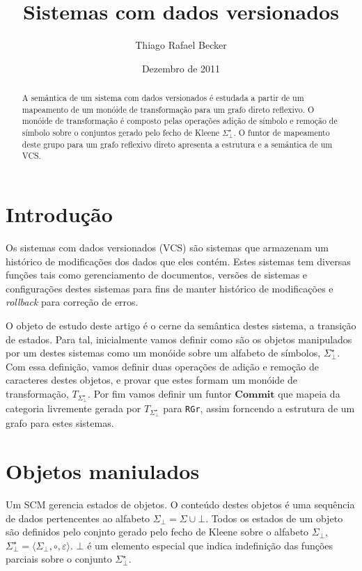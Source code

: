 \documentclass[a4paper]{article}
\title{Sistemas com dados versionados}
\author{Thiago Rafael Becker}
\date{Dezembro de 2011}
\newcommand{\baseset}{{\Sigma^\star_\bot}}
\newcommand{\transMon}{{T_\baseset}}
\newcommand{\composition}{{\circ}}
\newcommand{\commit}{{\mathbf{Commit}}}
\begin{document}
\maketitle
\begin{abstract}
A semântica de um sistema com dados versionados é estudada a partir de um mapeamento de um monóide de transformação para um grafo direto reflexivo. O monóide de transformação é composto pelas operações adição de símbolo e remoção de símbolo sobre o conjuntos gerado pelo fecho de Kleene $\baseset$. O funtor de mapeamento deste grupo para um grafo reflexivo direto apresenta a estrutura e a semântica de um VCS.
\end{abstract}

\section*{Introdução}
Os sistemas com dados versionados (VCS) são sistemas que armazenam um histórico de modificações dos dados que eles contém. Estes sistemas tem diversas funções tais como gerenciamento de documentos, versões de sistemas e configurações destes sistemas para fins de manter histórico de modificações e {\it rollback} para correção de erros.

O objeto de estudo deste artigo é o cerne da semântica destes sistema, a transição de estados. Para tal, inicialmente vamos definir como são os objetos manipulados por um destes sistemas como um monóide sobre um alfabeto de símbolos, $\baseset$. Com essa definição, vamos definir duas operações de adição e remoção de caracteres destes objetos, e provar que estes formam um monóide de transformação, $\transMon$. Por fim vamos definir um funtor $\commit$ que mapeia da categoria livremente gerada por $\transMon$ para {\tt RGr}, assim forncendo a estrutura de um grafo para estes sistemas.

\section*{Objetos maniulados} \label{sec:intuitiva}
Um SCM gerencia estados de objetos. O conteúdo destes objetos é uma sequência de dados pertencentes ao alfabeto $\Sigma_\bot = \Sigma \cup \bot$. Todos os estados de um objeto são definidos pelo conjnto gerado pelo fecho de Kleene sobre o alfabeto $\Sigma_\bot$, $\baseset = \langle\Sigma_\bot, \composition, \varepsilon\rangle$. $\bot$ é um elemento especial que indica indefinição das funções parciais sobre o conjunto $\baseset$.
\end{document}

